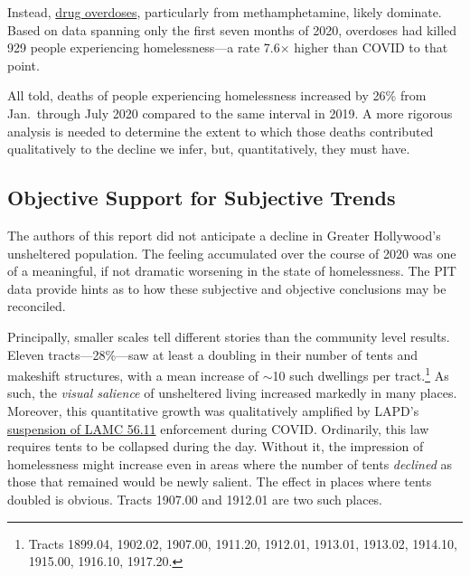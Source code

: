 \documentclass[11pt,twocolumn]{article}
\begin{document}
Instead, \href{http://publichealth.lacounty.gov/chie/reports/HomelessMortality2020_CHIEBrief_Final.pdf}{drug overdoses},
particularly from methamphetamine, likely dominate. Based on data spanning only the first seven months of 2020, overdoses had
killed 929 people experiencing homelessness---a rate 7.6$\times$ higher than COVID to that point.

All told, deaths of people experiencing homelessness increased by 26\% from Jan.\ through July 2020 compared to 
the same interval in 2019. A more rigorous analysis is needed to determine the extent to which those deaths contributed 
qualitatively to the decline we infer, but, quantitatively, they must have.

\subsection{Objective Support for Subjective Trends}

The authors of this report did not anticipate a decline in Greater Hollywood's unsheltered population.
The feeling accumulated over the course of 2020 was one of a meaningful, if not dramatic worsening in the
state of homelessness. The PIT data provide hints as to how these subjective and objective conclusions may be
reconciled.

Principally, smaller scales tell different stories than the community level results. Eleven tracts---28\%---saw at 
least a doubling in their number of tents and makeshift structures, with a mean increase of $\sim$10 such dwellings
per tract.\footnote{Tracts 1899.04, 1902.02, 1907.00, 1911.20, 1912.01, 1913.01, 1913.02, 1914.10, 1915.00,
1916.10, 1917.20.} As such, the {\it visual salience} of unsheltered living increased markedly in many places. Moreover,
this quantitative growth was qualitatively amplified by LAPD's \href{https://clkrep.lacity.org/onlinedocs/2020/20-0147_misc_3-17-20_p.pdf}{suspension of LAMC 56.11} enforcement during COVID. 
Ordinarily, this law requires tents to be collapsed during the day. Without it, the impression of homelessness might 
increase even in areas where the number of tents {\it declined} as those that remained would be newly salient.
The effect in places where tents doubled is obvious. Tracts 1907.00 and 1912.01 are two such places.
\end{document}
